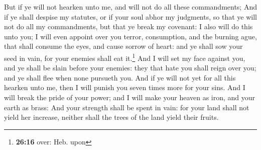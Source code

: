  But if ye will not hearken unto me, and will not do all
these commandments;  And if ye shall despise my statutes,
or if your soul abhor my judgments, so that ye will not do all my
commandments, but that ye break my covenant:  I also will
do this unto you; I will even appoint over you terror, consumption, and
the burning ague, that shall consume the eyes, and cause sorrow of
heart: and ye shall sow your seed in vain, for your enemies shall eat
it.\footnote{\textbf{26:16} over: Heb. upon}  And I will
set my face against you, and ye shall be slain before your enemies: they
that hate you shall reign over you; and ye shall flee when none pursueth
you.  And if ye will not yet for all this hearken unto
me, then I will punish you seven times more for your sins.
 And I will break the pride of your power; and I will
make your heaven as iron, and your earth as brass:  And
your strength shall be spent in vain: for your land shall not yield her
increase, neither shall the trees of the land yield their fruits.

